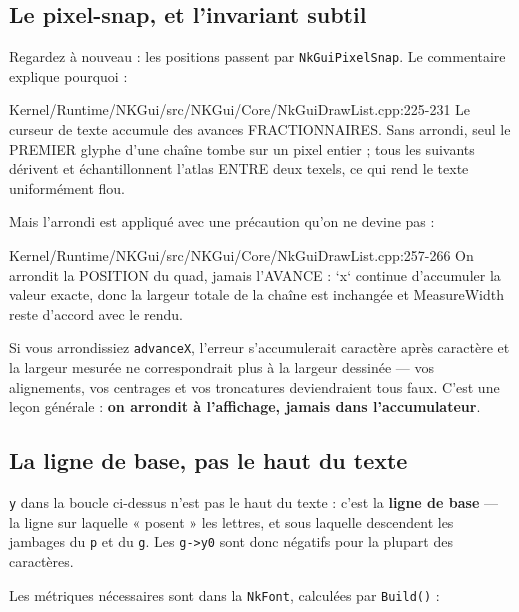 \subsection{Le pixel-snap, et l'invariant subtil}

Regardez à nouveau : les positions passent par \texttt{NkGuiPixelSnap}. Le
commentaire explique pourquoi :

\begin{nkcode}{Kernel/Runtime/NKGui/src/NKGui/Core/NkGuiDrawList.cpp:225-231}
 Le curseur de texte accumule des avances FRACTIONNAIRES. Sans arrondi,
 seul le PREMIER glyphe d'une chaîne tombe sur un pixel entier ; tous les
 suivants dérivent et échantillonnent l'atlas ENTRE deux texels, ce qui
 rend le texte uniformément flou.
\end{nkcode}

Mais l'arrondi est appliqué avec une précaution qu'on ne devine pas :

\begin{nkcode}{Kernel/Runtime/NKGui/src/NKGui/Core/NkGuiDrawList.cpp:257-266}
 On arrondit la POSITION du quad, jamais l'AVANCE : `x` continue
 d'accumuler la valeur exacte, donc la largeur totale de la chaîne
 est inchangée et MeasureWidth reste d'accord avec le rendu.
\end{nkcode}

\begin{nkretenir}
Si vous arrondissiez \texttt{advanceX}, l'erreur s'accumulerait caractère après
caractère et la largeur mesurée ne correspondrait plus à la largeur dessinée —
vos alignements, vos centrages et vos troncatures deviendraient tous faux. C'est
une leçon générale : \textbf{on arrondit à l'affichage, jamais dans
l'accumulateur}.
\end{nkretenir}

\subsection{La ligne de base, pas le haut du texte}

\texttt{y} dans la boucle ci-dessus n'est pas le haut du texte : c'est la
\textbf{ligne de base} — la ligne sur laquelle « posent » les lettres, et sous
laquelle descendent les jambages du \texttt{p} et du \texttt{g}. Les
\texttt{g->y0} sont donc négatifs pour la plupart des caractères.

Les métriques nécessaires sont dans la \texttt{NkFont}, calculées par
\texttt{Build()} :

